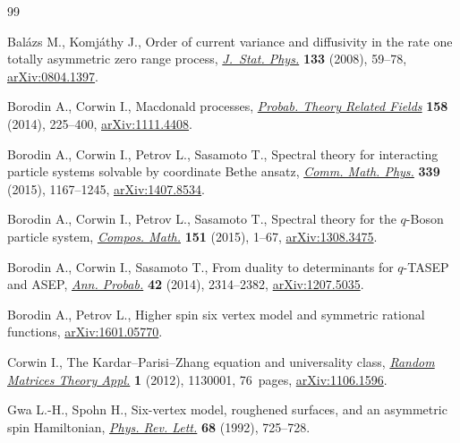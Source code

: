 \documentclass[pdftex]{sigma}
\numberwithin{equation}{section}
\begin{document}
\begin{thebibliography}{99}
\footnotesize\itemsep=0pt

Bal{\'a}zs M., Komj{\'a}thy J., Order of current variance and dif\/fusivity in
 the rate one totally asymmetric zero range process, \href{http://dx.doi.org/10.1007/s10955-008-9604-1}{\textit{J.~Stat. Phys.}}
 \textbf{133} (2008), 59--78, \href{http://arxiv.org/abs/0804.1397}{arXiv:0804.1397}.

Borodin A., Corwin I., Macdonald processes, \href{http://dx.doi.org/10.1007/s00440-013-0482-3}{\textit{Probab. Theory Related
 Fields}} \textbf{158} (2014), 225--400, \href{http://arxiv.org/abs/1111.4408}{arXiv:1111.4408}.

Borodin A., Corwin I., Petrov L., Sasamoto T., Spectral theory for interacting
 particle systems solvable by coordinate {B}ethe ansatz, \href{http://dx.doi.org/10.1007/s00220-015-2424-7}{\textit{Comm. Math.
 Phys.}} \textbf{339} (2015), 1167--1245, \href{http://arxiv.org/abs/1407.8534}{arXiv:1407.8534}.

Borodin A., Corwin I., Petrov L., Sasamoto T., Spectral theory for the
 {$q$}-{B}oson particle system, \href{http://dx.doi.org/10.1112/S0010437X14007532}{\textit{Compos. Math.}} \textbf{151} (2015),
 1--67, \href{http://arxiv.org/abs/1308.3475}{arXiv:1308.3475}.

Borodin A., Corwin I., Sasamoto T., From duality to determinants for
 {$q$}-{TASEP} and {ASEP}, \href{http://dx.doi.org/10.1214/13-AOP868}{\textit{Ann. Probab.}} \textbf{42} (2014),
 2314--2382, \href{http://arxiv.org/abs/1207.5035}{arXiv:1207.5035}.

Borodin A., Petrov L., Higher spin six vertex model and symmetric rational
 functions, \href{http://arxiv.org/abs/1601.05770}{arXiv:1601.05770}.

Corwin I., The {K}ardar--{P}arisi--{Z}hang equation and universality class,
 \href{http://dx.doi.org/10.1142/S2010326311300014}{\textit{Random Matrices Theory Appl.}} \textbf{1} (2012), 1130001, 76~pages,
 \href{http://arxiv.org/abs/1106.1596}{arXiv:1106.1596}.

Gwa L.-H., Spohn H., Six-vertex model, roughened surfaces, and an asymmetric
 spin {H}amiltonian, \href{http://dx.doi.org/10.1103/PhysRevLett.68.725}{\textit{Phys. Rev. Lett.}} \textbf{68} (1992), 725--728.


\end{thebibliography}
\end{document}
